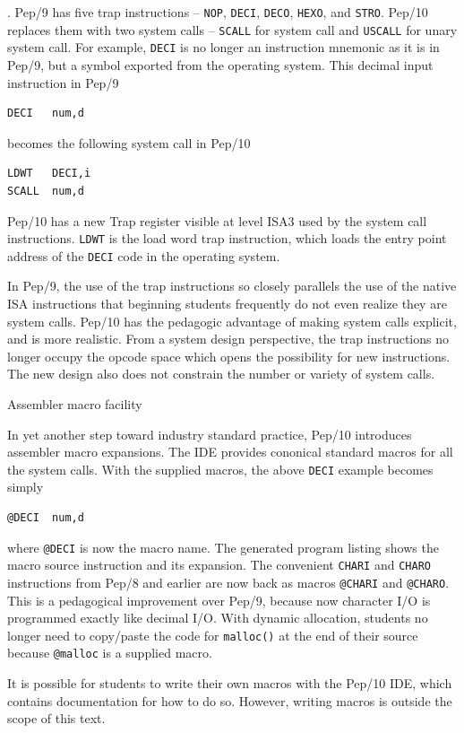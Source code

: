 \documentclass[10pt,fleqn]{book}
\newenvironment{exercises}
   {\begin{list}
      {\arabic{ecounter}.}
      {
         \usecounter{ecounter}
         \setcounter {ecounter}{0}
         \setlength\leftmargin{2pc}
         \setlength\labelwidth{6pc}
         \setlength\labelsep{1pc}
      }}
   {\end{list}}
\newcounter{ecounter}
\begin{document}
\begin{exercises}
Pep/9 has five trap instructions -- \verb|NOP|, \verb|DECI|, \verb|DECO|, \verb|HEXO|, and \verb|STRO|.
Pep/10 replaces them with two system calls -- \verb|SCALL| for system call and \verb|USCALL| for unary system call.
For example, \verb|DECI| is no longer an instruction mnemonic as it is in Pep/9, but a symbol exported from the operating system.
This decimal input instruction in Pep/9
\begin{verbatim}
DECI   num,d
\end{verbatim}
becomes the following system call in Pep/10
\begin{verbatim}
LDWT   DECI,i
SCALL  num,d
\end{verbatim}
Pep/10 has a new Trap register visible at level ISA3 used by the system call instructions.
\verb|LDWT| is the load word trap instruction, which loads the entry point address of the \verb|DECI| code in the operating system.

In Pep/9, the use of the trap instructions so closely parallels the use of the native ISA instructions that beginning students frequently do not even realize they are system calls.
Pep/10 has the pedagogic advantage of making system calls explicit, and is more realistic.
From a system design perspective, the trap instructions no longer occupy the opcode space which opens the possibility for new instructions.
The new design also does not constrain the number or variety of system calls.

\item Assembler macro facility

In yet another step toward industry standard practice, Pep/10 introduces assembler macro expansions.
The IDE provides cononical standard macros for all the system calls.
With the supplied macros, the above \verb|DECI| example becomes simply
\begin{verbatim}
@DECI  num,d
\end{verbatim}
where \verb|@DECI| is now the macro name.
The generated program listing shows the macro source instruction and its expansion.
The convenient \verb|CHARI| and \verb|CHARO| instructions from Pep/8 and earlier are now back as macros \verb|@CHARI| and \verb|@CHARO|.
This is a pedagogical improvement over Pep/9, because now character I/O is programmed exactly like decimal I/O.
With dynamic allocation, students no longer need to copy/paste the code for \verb|malloc()| at the end of their source because \verb|@malloc| is a supplied macro.

It is possible for students to write their own macros with the Pep/10 IDE, which contains documentation for how to do so.
However, writing macros is outside the scope of this text.


\end{exercises}
\end{document}
